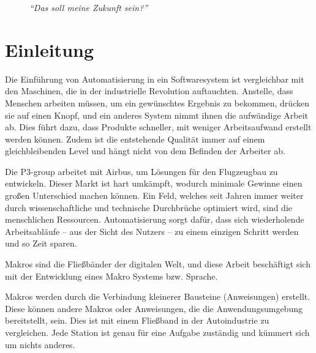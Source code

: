     \begin{figure}[H]
      \centering

      \caption{\textit{``Das soll meine Zukunft sein?''}}
    \end{figure}

\pagebreak

\section{Einleitung}
\label{sec:Einleitung}
  Die Einführung von Automatisierung in ein Softwaresystem ist vergleichbar mit den Maschinen, die in der industrielle Revolution auftauchten. Anstelle, dass Menschen arbeiten müssen, um ein gewünschtes Ergebnis zu bekommen, drücken sie auf einen Knopf, und ein anderes System nimmt ihnen die aufwändige Arbeit ab. Dies führt dazu, dass Produkte schneller, mit weniger Arbeitsaufwand erstellt werden können. Zudem ist die entstehende Qualität immer auf einem gleichbleibenden Level und hängt nicht von dem Befinden der Arbeiter ab.

  Die P3-group arbeitet mit Airbus, um Lösungen für den Flugzeugbau zu entwickeln. Dieser Markt ist hart umkämpft, wodurch minimale Gewinne einen großen Unterschied machen können. Ein Feld, welches seit Jahren immer weiter durch wissenschaftliche und technische Durchbrüche optimiert wird, sind die menschlichen Ressourcen. Automatisierung sorgt dafür, dass sich wiederholende Arbeitsabläufe -- aus der Sicht des Nutzers -- zu einem einzigen Schritt werden und so Zeit sparen.

  Makros sind die Fließbänder der digitalen Welt, und diese Arbeit beschäftigt sich mit der Entwicklung eines Makro Systems bzw. Sprache.

  Makros werden durch die Verbindung kleinerer Bausteine (Anweisungen) erstellt. Diese können andere Makros oder Anweisungen, die die Anwendungsumgebung bereitstellt, sein. Dies ist mit einem Fließband in der Autoindustrie zu vergleichen. Jede Station ist genau für eine Aufgabe zuständig und kümmert sich um nichts anderes.

